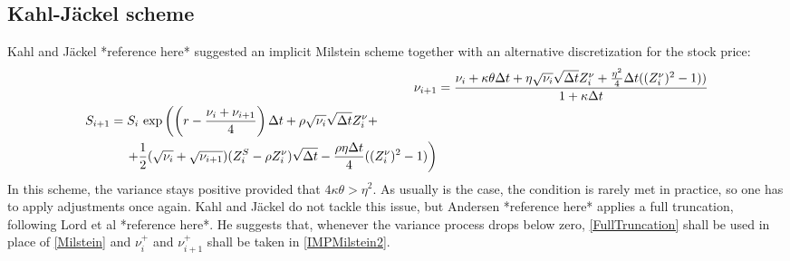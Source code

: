 \documentclass[12pt]{article}
\numberwithin{equation}{section}
\begin{document}
\subsection{Kahl-J\"ackel scheme}
Kahl and J\"ackel *reference here* suggested an implicit Milstein scheme together with an alternative discretization for the stock price:
\begin{align}\label{IMPMilstein}
			\nu_{i+1} &= \frac{\nu_i + \kappa \theta \Delta t + \eta \sqrt{\nu_i}\sqrt{\Delta t}Z_i^\nu + \frac{\eta^2}{4}\Delta t ((Z_i^\nu)^2 - 1 ))}{1 + \kappa \Delta t} \\
			\begin{split}
			\label{IMPMilstein2}
			S_{i+1} &= S_i \ \text{exp} \left ( \left (r - \frac{\nu_i + \nu_{i+1}}{4} \right ) \Delta t + \rho\sqrt{\nu_i}\sqrt{\Delta t}Z_i^\nu + \right.  \\ 
			&\mathrel{\phantom{=}} \left. + \frac{1}{2} (\sqrt{\nu_i} + \sqrt{\nu_{i+1}} )(Z_i^S - \rho Z_i^\nu)\sqrt{\Delta t} - \frac{\rho \eta \Delta t}{4} ((Z_i^\nu)^2 - 1) \vphantom{\frac{\nu_i + \nu_{i+1}}{4}} \right )
		\end{split}
\end{align}
In this scheme, the variance stays positive provided that $4\kappa \theta > \eta^2$. As usually is the case, the condition is rarely met in practice, so one has to apply adjustments once again. Kahl and J\"ackel do not tackle this issue, but Andersen *reference here* applies a full truncation, following Lord et al *reference here*. He suggests that, whenever the variance process drops below zero, \ref{FullTruncation} shall be used in place of \ref{Milstein} and $\nu_i^+$ and $\nu_{i+1}^+$ shall be taken in \ref{IMPMilstein2}.
\end{document}
